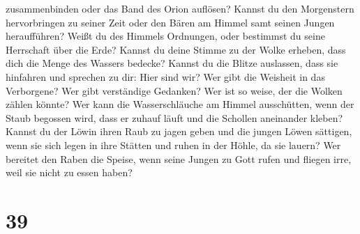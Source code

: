 zusammenbinden oder das Band des Orion auflösen?  Kannst
du den Morgenstern hervorbringen zu seiner Zeit oder den Bären am Himmel
samt seinen Jungen heraufführen?  Weißt du des Himmels
Ordnungen, oder bestimmst du seine Herrschaft über die Erde?
 Kannst du deine Stimme zu der Wolke erheben, dass dich
die Menge des Wassers bedecke?  Kannst du die Blitze
auslassen, dass sie hinfahren und sprechen zu dir: Hier sind wir?
 Wer gibt die Weisheit in das Verborgene? Wer gibt
verständige Gedanken?  Wer ist so weise, der die Wolken
zählen könnte? Wer kann die Wasserschläuche am Himmel ausschütten,
 wenn der Staub begossen wird, dass er zuhauf läuft und
die Schollen aneinander kleben?  Kannst du der Löwin
ihren Raub zu jagen geben und die jungen Löwen sättigen, 
wenn sie sich legen in ihre Stätten und ruhen in der Höhle, da sie
lauern?  Wer bereitet den Raben die Speise, wenn seine
Jungen zu Gott rufen und fliegen irre, weil sie nicht zu essen haben?

\hypertarget{section-38}{%
\section{39}\label{section-38}}

